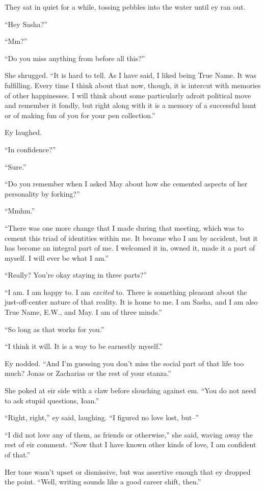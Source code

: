 They sat in quiet for a while, tossing pebbles into the water until ey ran out.

``Hey Sasha?''

``Mm?''

``Do you miss anything from before all this?''

She shrugged. ``It is hard to tell. As I have said, I liked being True Name. It was fulfilling. Every time I think about that now, though, it is intercut with memories of other happinesses. I will think about some particularly adroit political move and remember it fondly, but right along with it is a memory of a successful hunt or of making fun of you for your pen collection.''

Ey laughed.

``In confidence?''

``Sure.''

``Do you remember when I asked May about how she cemented aspects of her personality by forking?''

``Mmhm.''

``There was one more change that I made during that meeting, which was to cement this triad of identities within me. It became who I am by accident, but it has become an integral part of me. I welcomed it in, owned it, made it a part of myself. I will ever be what I am.''

``Really? You're okay staying in three parts?''

``I am. I am happy to. I am \emph{excited} to. There is something pleasant about the just-off-center nature of that reality. It is home to me. I am Sasha, and I am also True Name, E.W., and May. I am of three minds.''

``So long as that works for you.''

``I think it will. It is a way to be earnestly myself.''

Ey nodded. ``And I'm guessing you don't miss the social part of that life too much? Jonas or Zacharias or the rest of your stanza.''

She poked at eir side with a claw before slouching against em. ``You do not need to ask stupid questions, Ioan.''

``Right, right,'' ey said, laughing. ``I figured no love lost, but--''

``I did not love any of them, as friends or otherwise,'' she said, waving away the rest of eir comment. ``Now that I have known other kinds of love, I am confident of that.''

Her tone wasn't upset or dismissive, but was assertive enough that ey dropped the point. ``Well, writing sounds like a good career shift, then.''

